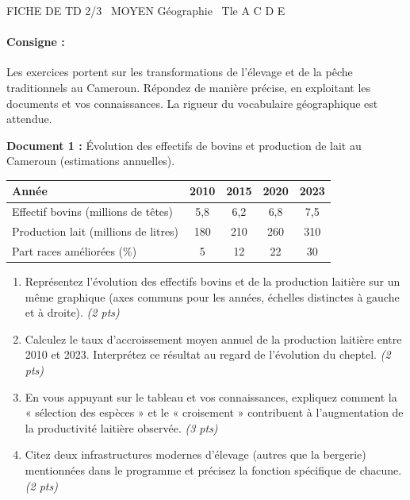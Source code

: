 \documentclass[11pt]{article}
\begin{document}
\begin{tcolorbox}[enhanced,colback=popink,colframe=popink,arc=10pt,boxrule=0pt,left=12pt,right=12pt,top=9pt,bottom=9pt]
{\color{white}\popxbold\small FICHE DE TD 2/3 \textbullet\ MOYEN \hfill Géographie \textbullet\ Tle A C D E\par}
\end{tcolorbox}
\vspace{4pt}
\paragraph{Consigne :} Les exercices portent sur les transformations de l'élevage et de la pêche traditionnels au Cameroun. Répondez de manière précise, en exploitant les documents et vos connaissances. La rigueur du vocabulaire géographique est attendue.

\begin{exercice}
\textbf{Document 1 :} Évolution des effectifs de bovins et production de lait au Cameroun (estimations annuelles).

\begin{tabular}{lcccc}
\toprule
\textbf{Année} & \textbf{2010} & \textbf{2015} & \textbf{2020} & \textbf{2023} \\
\midrule
Effectif bovins (millions de têtes) & 5,8 & 6,2 & 6,8 & 7,5 \\
Production lait (millions de litres) & 180 & 210 & 260 & 310 \\
Part races améliorées (\%) & 5 & 12 & 22 & 30 \\
\bottomrule
\end{tabular}

\begin{enumerate}
    \item Représentez l'évolution des effectifs bovins et de la production laitière sur un même graphique (axes communs pour les années, échelles distinctes à gauche et à droite). \textit{(2 pts)}
    \item Calculez le taux d'accroissement moyen annuel de la production laitière entre 2010 et 2023. Interprétez ce résultat au regard de l'évolution du cheptel. \textit{(2 pts)}
    \item En vous appuyant sur le tableau et vos connaissances, expliquez comment la « sélection des espèces » et le « croisement » contribuent à l'augmentation de la productivité laitière observée. \textit{(3 pts)}
    \item Citez deux infrastructures modernes d'élevage (autres que la bergerie) mentionnées dans le programme et précisez la fonction spécifique de chacune. \textit{(2 pts)}
\end{enumerate}
\end{exercice}
\end{document}
